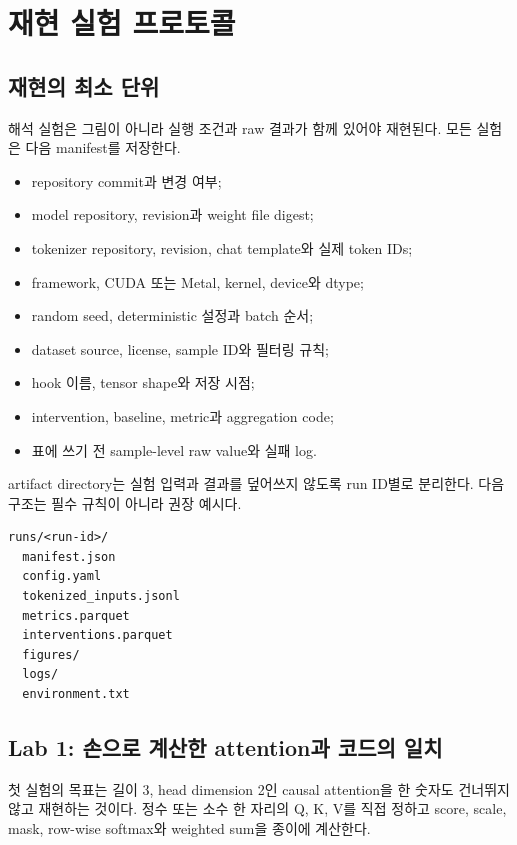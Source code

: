 \chapter{재현 실험 프로토콜}
\label{app:experiments}

\section{재현의 최소 단위}

해석 실험은 그림이 아니라 실행 조건과 raw 결과가 함께 있어야 재현된다.
모든 실험은 다음 manifest를 저장한다.

\begin{itemize}
  \item repository commit과 변경 여부;
  \item model repository, revision과 weight file digest;
  \item tokenizer repository, revision, chat template와 실제 token IDs;
  \item framework, CUDA 또는 Metal, kernel, device와 dtype;
  \item random seed, deterministic 설정과 batch 순서;
  \item dataset source, license, sample ID와 필터링 규칙;
  \item hook 이름, tensor shape와 저장 시점;
  \item intervention, baseline, metric과 aggregation code;
  \item 표에 쓰기 전 sample-level raw value와 실패 log.
\end{itemize}

artifact directory는 실험 입력과 결과를 덮어쓰지 않도록 run ID별로 분리한다.
다음 구조는 필수 규칙이 아니라 권장 예시다.

\begin{lstlisting}[language={},caption={권장 실험 artifact 구조}]
runs/<run-id>/
  manifest.json
  config.yaml
  tokenized_inputs.jsonl
  metrics.parquet
  interventions.parquet
  figures/
  logs/
  environment.txt
\end{lstlisting}

\section{Lab 1: 손으로 계산한 attention과 코드의 일치}

첫 실험의 목표는 길이 3, head dimension 2인 causal attention을 한 숫자도 건너뛰지 않고 재현하는 것이다.
정수 또는 소수 한 자리의 Q, K, V를 직접 정하고 score, scale, mask, row-wise softmax와 weighted sum을 종이에 계산한다.

